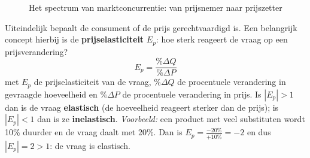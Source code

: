 \documentclass[a4paper,11pt]{article}
\begin{document}
\begin{description}
\begin{figure}[ht]
              \caption{Het spectrum van marktconcurrentie: van prijsnemer naar prijszetter}
              \label{fig:market_spectrum}
          \end{figure}
          \FloatBarrier %

    \item{}
          Uiteindelijk bepaalt de consument of de prijs gerechtvaardigd is.
          Een belangrijk concept hierbij is de \textbf{prijselasticiteit} $E_p$: hoe sterk reageert de vraag op een prijsverandering?
          \[ E_p = \frac{\%\Delta Q}{\%\Delta P} \]
          met $E_p$ de prijselasticiteit van de vraag, $\%\Delta Q$ de procentuele verandering in gevraagde hoeveelheid
          en $\%\Delta P$ de procentuele verandering in prijs.
          Is $|E_p| > 1$ dan is de vraag \textbf{elastisch} (de hoeveelheid reageert sterker dan de prijs);
          is $|E_p| < 1$ dan is ze \textbf{inelastisch}.
          \textit{Voorbeeld:} een product met veel substituten wordt 10\% duurder en de vraag daalt met 20\%.
          Dan is $E_p = \frac{-20\%}{+10\%} = -2$ en dus $|E_p| = 2 > 1$: de vraag is elastisch.

          \begin{figure}[ht]
              \centering
              \begin{minipage}{0.45\textwidth}
                  \centering
\end{minipage}
\end{figure}
\end{description}
\end{document}
